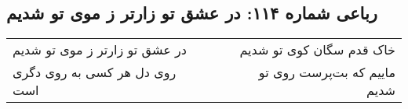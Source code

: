 \begin{center}
\section*{رباعی شماره ۱۱۴: در عشق تو زارتر ز موی تو شدیم}
\label{sec:114}
\begin{longtable}{l p{0.5cm} r}
در عشق تو زارتر ز موی تو شدیم
&&
خاک قدم سگان کوی تو شدیم
\\
روی دل هر کسی به روی دگری است
&&
ماییم که بت‌پرست روی تو شدیم
\\
\end{longtable}
\end{center}
